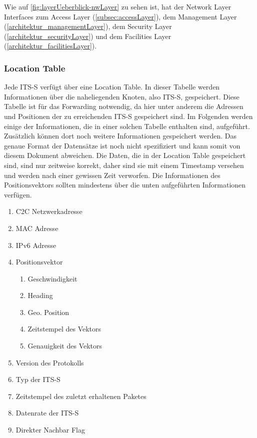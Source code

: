 Wie auf \autoref{fig:layerUeberblick-nwLayer} zu sehen ist, hat der Network Layer Interfaces zum Access Layer (\autoref{subsec:accessLayer}), dem Management Layer (\autoref{architektur_managementLayer}), dem Security Layer (\autoref{architektur_securityLayer}) und dem Facilities Layer (\autoref{architektur_facilitiesLayer}).

\subsubsection{Location Table}
Jede \ac{ITS-S} verfügt über eine Location Table. In dieser Tabelle werden Informationen über die naheliegenden Knoten, also \ac{ITS-S}, gespeichert. Diese Tabelle ist für das Forwarding notwendig, da hier unter anderem die Adressen und Positionen der zu erreichenden \ac{ITS-S} gespeichert sind. 
Im Folgenden werden einige der Informationen, die in einer solchen Tabelle enthalten sind, aufgeführt. Zusätzlich können dort noch weitere Informationen  gespeichert werden. Das genaue Format der Datensätze ist noch nicht spezifiziert und kann somit von diesem Dokument abweichen. Die Daten, die in der Location Table gespeichert sind, sind nur zeitweise korrekt, daher sind sie mit einem Timestamp versehen und werden nach einer gewissen Zeit verworfen. Die Informationen des Positionsvektors sollten mindestens über die unten aufgeführten Informationen verfügen. 
\begin{enumerate}
      \item C2C Netzwerkadresse
      \item MAC Adresse
      \item IPv6 Adresse
      \item Positionsvektor
      \begin{enumerate}
      	\item Geschwindigkeit
	\item Heading
	\item Geo. Position
	\item Zeitstempel des Vektors
	\item Genauigkeit des Vektors
      \end{enumerate}
      \item Version des Protokolls
      \item Typ der \ac{ITS-S}
      \item Zeitstempel des zuletzt erhaltenen Paketes
      \item Datenrate der \ac{ITS-S}
      \item Direkter Nachbar Flag
\end{enumerate}

